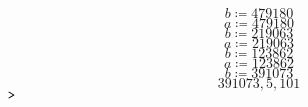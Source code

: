 \documentclass{article}
\begin{document}
\begin{dmath*}
b \coloneqq 479180
\end{dmath*}
\vspace{-\bigskipamount}
\begin{dmath*}
a \coloneqq 479180
\end{dmath*}
\vspace{-\bigskipamount}
\begin{dmath*}
b \coloneqq 219063
\end{dmath*}
\vspace{-\bigskipamount}
\begin{dmath*}
a \coloneqq 219063
\end{dmath*}
\vspace{-\bigskipamount}
\begin{dmath*}
b \coloneqq 123862
\end{dmath*}
\vspace{-\bigskipamount}
\begin{dmath*}
a \coloneqq 123862
\end{dmath*}
\vspace{-\bigskipamount}
\begin{dmath*}
b \coloneqq 391073
\end{dmath*}
\vspace{-\bigskipamount}
\begin{dmath}\label{(4)}
391073,5,101
\end{dmath}
\mapleinput
{$ \displaystyle \texttt{>\,} \, $}
\end{document}
